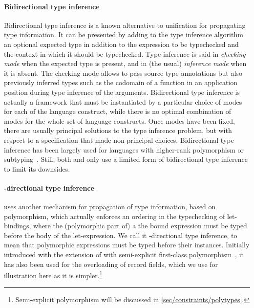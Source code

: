 \documentclass[acmsmall,screen,nonacm]{acmart}
\begin{document}
\paragraph{Bidirectional type inference}

Bidirectional type inference is a known alternative to unification for
propagating type information. It can be presented by adding to the type
inference algorithm an optional expected type in addition to the expression
to be typechecked and the context in which it should be typechecked.  Type
inference is said in \emph{checking mode} when the expected type is present,
and in (the usual) \emph{inference mode} when it is absent. The checking
mode allows to pass source type annotations but also previously inferred
types such as the codomain of a function in an application position during
type inference of the arguments.
%
Bidirectional type inference is actually a framework that must be
instantiated by a particular choice of modes for each of the language
construct, while there is no optimal combination of modes for the whole set
of language constructs. Once modes have been fixed, there are usually
principal solutions to the type inference problem, but with respect to a
specification that made non-principal choices.
%
Bidirectional type inference has been largely used for languages with
higher-rank polymorphism or subtyping~. Still, both \OCaml
and \Haskell only use a limited form of bidirectional type inference to
limit its downsides.


\paragraph{\Geninst-directional type inference}
\OCaml uses another mechanism for propagation of type information,
based on polymorphism, which actually enforces an ordering in the
typechecking of let-bindings, where the (polymorphic part of) a the
bound expression must be typed before the body of the let-expression.
We call it \textbf{\geninst}-directional type inference, to mean that
polymorphic expressions must be typed before their
instances.  Initially introduced with the extension of \ML with
semi-explicit first-class polymorphism~\cite {Garrigue-Remy/poly-ml},
it has also been used for the overloading of record fields, which we
use for illustration here as it is simpler.\footnote {Semi-explicit
  polymorphism will be discussed in \cref{sec/constraints/polytypes}.}
\end{document}
